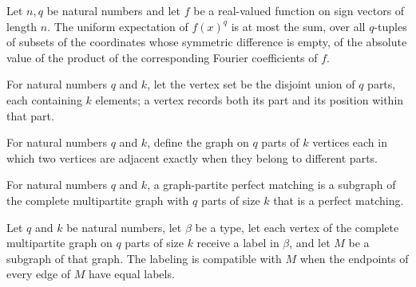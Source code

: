 \begin{theorem}
\label{FABL.expect_pow_le_sum_abs_fourierCoeff_of_tupleSymmDiff_empty}
\leanok
{}
Let $n,q$ be natural numbers and let $f$ be a real-valued function on sign vectors of
length $n$. The uniform expectation of $f(x)^q$ is at most the sum, over all $q$-tuples
of subsets of the coordinates whose symmetric difference is empty, of the absolute value
of the product of the corresponding Fourier coefficients of $f$.
\end{theorem}

\begin{definition}
\label{FABL.BookPartiteVertex}
\leanok
For natural numbers $q$ and $k$, let the vertex set be the disjoint union of $q$ parts,
each containing $k$ elements; a vertex records both its part and its position within
that part.
\end{definition}

\begin{definition}
\label{FABL.bookPartiteGraph}
\leanok
{}
For natural numbers $q$ and $k$, define the graph on $q$ parts of $k$ vertices each in
which two vertices are adjacent exactly when they belong to different parts.
\end{definition}

\begin{definition}
\label{FABL.GraphPartitePerfectMatching}
\leanok
{}
For natural numbers $q$ and $k$, a graph-partite perfect matching is a subgraph of the
complete multipartite graph with $q$ parts of size $k$ that is a perfect matching.
\end{definition}

\begin{definition}
\label{FABL.MatchingCompatibleLabeling}
\leanok
{}
Let $q$ and $k$ be natural numbers, let $\beta$ be a type, let each vertex of the
complete multipartite graph on $q$ parts of size $k$ receive a label in $\beta$, and
let $M$ be a subgraph of that graph. The labeling is compatible with $M$ when the
endpoints of every edge of $M$ have equal labels.
\end{definition}

